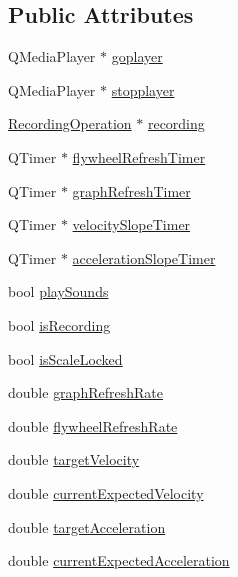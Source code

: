 \subsection*{Public Attributes}
\begin{DoxyCompactItemize}
\item 
Q\+Media\+Player $\ast$ \hyperlink{class_main_window_ab1b0abac053ed137235ee5d4b205a107}{goplayer}
\item 
Q\+Media\+Player $\ast$ \hyperlink{class_main_window_a3c60004c5faa4c7a29b81eb2723d36b9}{stopplayer}
\item 
\hyperlink{class_recording_operation}{Recording\+Operation} $\ast$ \hyperlink{class_main_window_ad5624c21fd77dfdb33d4a7320b6a4ab6}{recording}
\item 
Q\+Timer $\ast$ \hyperlink{class_main_window_afa18558be9a3153936f12dfcdc0e6d8e}{flywheel\+Refresh\+Timer}
\item 
Q\+Timer $\ast$ \hyperlink{class_main_window_aaeb4288152c50a071e0c4df3e1baba85}{graph\+Refresh\+Timer}
\item 
Q\+Timer $\ast$ \hyperlink{class_main_window_abce15ec85ee2078bbb147d081e0a098b}{velocity\+Slope\+Timer}
\item 
Q\+Timer $\ast$ \hyperlink{class_main_window_a61e3faf86f0c2bd56921aacdd4e64c68}{acceleration\+Slope\+Timer}
\item 
bool \hyperlink{class_main_window_a034e18132b1729fa204f92305fb5e71f}{play\+Sounds}
\item 
bool \hyperlink{class_main_window_a23fa0be440d34e4569d9e2d323410e7d}{is\+Recording}
\item 
bool \hyperlink{class_main_window_a1f43f19e84b444053fd775d25d2aa07d}{is\+Scale\+Locked}
\item 
double \hyperlink{class_main_window_aa2c569cb70d25d85e43499d4dca2154b}{graph\+Refresh\+Rate}
\item 
double \hyperlink{class_main_window_ad450b124c5daea75470bb6550081011e}{flywheel\+Refresh\+Rate}
\item 
double \hyperlink{class_main_window_a468f6a2dee29d0488aa82f7e2583b5ae}{target\+Velocity}
\item 
double \hyperlink{class_main_window_a879db4d65600c3b3945d67976d9a8622}{current\+Expected\+Velocity}
\item 
double \hyperlink{class_main_window_a585bfd03f54d4e1f15109de662806090}{target\+Acceleration}
\item 
double \hyperlink{class_main_window_a6382bf386001d617cd5b717a92c5004d}{current\+Expected\+Acceleration}

\end{DoxyCompactItemize}
